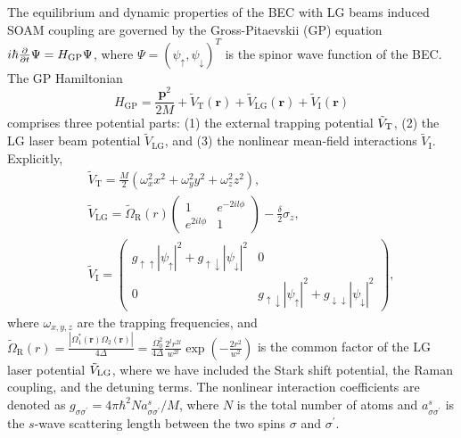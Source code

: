\documentclass[twocolumn,pra,unsortedaddress,showpacs,floatfix,citeautoscript,nofootinbib]{revtex4-1}
\begin{document}
The equilibrium and dynamic properties of the BEC with LG beams
induced SOAM
coupling are governed by the Gross-Pitaevskii (GP) equation $i\hbar \frac{%
\partial }{\partial t}\Psi =H_{\text{GP}}\Psi $, where $\Psi =(\psi
_{\uparrow },\psi _{\downarrow })^{T}$ is the spinor wave function
of the BEC. The GP Hamiltonian
\begin{equation}
H_{\text{GP}}=\frac{\mathbf{p}^{2}}{2M}+\tilde{V}_{\text{T}}(\mathbf{r})+%
\tilde{V}_{\text{LG}}(\mathbf{r})+\tilde
{V}_{\text{I}}(\mathbf{r})
\end{equation}
comprises three potential parts: (1) the external trapping potential $\tilde{V}_{%
\text{T}}$, (2) the LG laser beam potential
$\tilde{V}_{\text{LG}}$, and (3) the nonlinear mean-field
interactions $\tilde {V}_{\text{I}}$. Explicitly,
\begin{eqnarray}
&&\tilde{V}_{\text{T}}=\frac{M}{2} \left(\omega _{x}^{2}x^{2}+\omega _{y}^{2}y^{2}+\omega _{z}^{2}z^{2}\right), \\
&&\tilde{V}_{\text{LG}}=\tilde{\Omega}_{\text{R}}(r)
\begin{pmatrix}
1 & e^{-2il\phi } \\
e^{2il\phi } & 1
\end{pmatrix}
-\frac{\delta }{2}\sigma _{z}, \\
&&\tilde {V}_{\text{I}}=\left(
\begin{array}{cc}
g_{\uparrow \uparrow }|\psi _{\uparrow }|^{2}+g_{\uparrow \downarrow }|\psi
_{\downarrow }|^{2} & 0 \\
0 & g_{\uparrow \downarrow }|\psi _{\uparrow }|^{2}+g_{\downarrow
\downarrow }|\psi _{\downarrow }|^{2}
\end{array}
\right) ,
\end{eqnarray}
where $\omega _{x,y,z}$ are the trapping frequencies, and
$\tilde{\Omega}_{\text{
R}}(r)=\frac{|\Omega_1^{*}(\mathbf{r})\Omega_2(\mathbf{r})|}{4\Delta}
=\frac{\Omega _{0}^{2}}{4\Delta}\frac{2^{l}r^{2l}}{w^{2l}}\exp
\left( -\frac{2r^{2}}{w^{2}}\right) $ is the common factor of the
LG laser potential $\tilde{V}_{\rm{LG}}$, where we have included
the Stark shift potential, the Raman coupling, and the detuning
terms. The nonlinear interaction coefficients are denoted as
$g_{\sigma \sigma ^{\prime }}=4\pi \hbar ^{2}Na_{\sigma \sigma
^{\prime }}^{s}/M$, where $N$ is the total number of atoms and
$a_{\sigma \sigma ^{\prime }}^{s}$ is the $s$-wave scattering
length between the two spins $\sigma $ and $\sigma ^{\prime }$.
\end{document}
